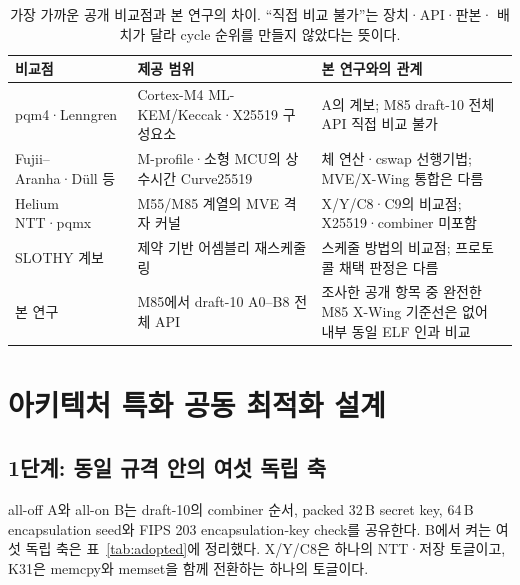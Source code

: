 \documentclass[runningheads,orivec]{llncs}
\begin{document}
\begin{table}[t]\centering\footnotesize
\caption{가장 가까운 공개 비교점과 본 연구의 차이. ``직접 비교 불가''는 장치·API·판본·
배치가 달라 cycle 순위를 만들지 않았다는 뜻이다.}
\label{tab:prior-art-boundary}
\renewcommand{\arraystretch}{1.12}
\begin{tabularx}{\textwidth}{@{}>{\raggedright\arraybackslash}p{2.5cm}>{\raggedright\arraybackslash}p{4.0cm}>{\raggedright\arraybackslash}X@{}}\toprule
비교점 & 제공 범위 & 본 연구와의 관계\\\midrule
pqm4·Lenngren & Cortex-M4 ML-KEM/Keccak·X25519 구성요소 & A의 계보; M85 draft-10 전체 API 직접 비교 불가\\
Fujii--Aranha·Düll 등 & M-profile·소형 MCU의 상수시간 Curve25519 & 체 연산·cswap 선행기법; MVE/X-Wing 통합은 다름\\
Helium NTT·pqmx & M55/M85 계열의 MVE 격자 커널 & X/Y/C8·C9의 비교점; X25519·combiner 미포함\\
SLOTHY 계보 & 제약 기반 어셈블리 재스케줄링 & 스케줄 방법의 비교점; 프로토콜 채택 판정은 다름\\
본 연구 & M85에서 draft-10 A0--B8 전체 API & 조사한 공개 항목 중 완전한 M85 X-Wing 기준선은 없어 내부 동일 ELF 인과 비교\\\bottomrule
\end{tabularx}
\end{table}

\FloatBarrier
\section{아키텍처 특화 공동 최적화 설계}\label{sec:design}

\subsection{1단계: 동일 규격 안의 여섯 독립 축}

all-off A와 all-on B는 draft-10의 combiner 순서, packed 32\,B secret key,
64\,B encapsulation seed와 FIPS 203 encapsulation-key check를 공유한다. B에서 켜는
여섯 독립 축은 표~\ref{tab:adopted}에 정리했다. X/Y/C8은 하나의 NTT·저장 토글이고,
K31은 memcpy와 memset을 함께 전환하는 하나의 토글이다.
\end{document}
